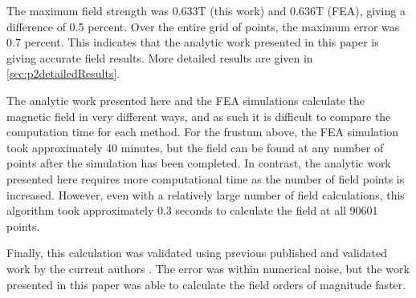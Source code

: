 The maximum field strength was 0.633\si{\tesla} (this work) and 0.636\si{\tesla} (FEA), giving a difference of 0.5 percent. Over the entire grid of points, the maximum error was 0.7 percent. This indicates that the analytic work presented in this paper is giving accurate field results. More detailed results are given in \ref{sec:p2detailedResults}.

The analytic work presented here and the FEA simulations calculate the magnetic field in very different ways, and as such it is difficult to compare the computation time for each method. For the frustum above, the FEA simulation took approximately 40 minutes, but the field can be found at any number of points after the simulation has been completed. In contrast, the analytic work presented here requires more computational time as the number of field points is increased. However, even with a relatively large number of field calculations, this algorithm took approximately 0.3 seconds to calculate the field at all 90601 points.

Finally, this calculation was validated using previous published and validated work by the current authors \cite{OConnell2020}. The error was within numerical noise, but the work presented in this paper was able to calculate the field orders of magnitude faster.

